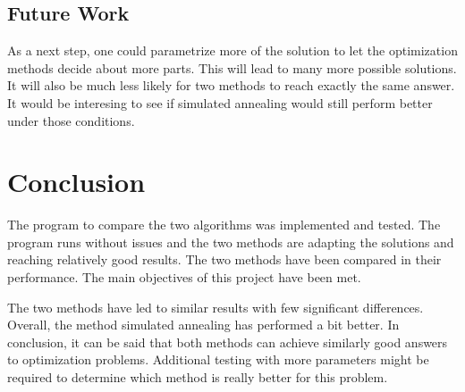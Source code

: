 \documentclass[10pt]{scrreprt}
\begin{document}
\section{Future Work}
As a next step, one could parametrize more of the solution to let the optimization methods decide about more parts. This will lead to many more possible solutions. It will also be much less likely for two methods to reach exactly the same answer. It would be interesing to see if simulated annealing would still perform better under those conditions.

\chapter{Conclusion}
The program to compare the two algorithms was implemented and tested. The program runs without issues and the two methods are adapting the solutions and reaching relatively good results. The two methods have been compared in their performance. The main objectives of this project have been met.

The two methods have led to similar results with few significant differences. Overall, the method simulated annealing has performed a bit better. In conclusion, it can be said that both methods can achieve similarly good answers to optimization problems. Additional testing with more parameters might be required to determine which method is really better for this problem. 

\newpage





\end{document}

